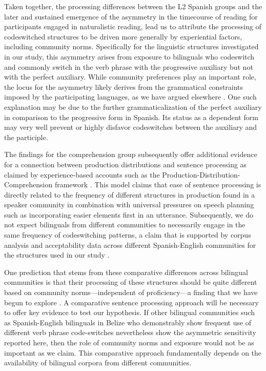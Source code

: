\documentclass[output=paper,colorlinks,citecolor=brown]{langscibook}
\begin{document}
Taken together, the processing differences between the L2 Spanish groups and the later and sustained emergence of the asymmetry in the timecourse of reading for participants engaged in naturalistic reading, lead us to attribute the processing of codeswitched structures to be driven more generally by experiential factors, including community norms. Specifically for the linguistic structures investigated in our study, this asymmetry arises from exposure to bilinguals who codeswitch and commonly switch in the verb phrase with the progressive auxiliary but not with the perfect auxiliary. While community preferences play an important role, the locus for the asymmetry likely derives from the grammatical constraints imposed by the participating languages, as we have argued elsewhere \citep{GuzzardoTamargoetal2016,ValdesKroffDussias2023}. One such explanation may be due to the further grammaticalization of the perfect auxiliary in comparison to the progressive form in Spanish. Its status as a dependent form may very well prevent or highly disfavor codeswitches between the auxiliary and the participle.

The findings for the comprehension group subsequently offer additional evidence for a connection between production distributions and sentence processing as claimed by experience-based accounts such as the Production-Distribution-Comprehension framework \citep{MacDonald2013}. This model claims that ease of sentence processing is directly related to the frequency of different structures in production found in a speaker community in combination with universal pressures on speech planning such as incorporating easier elements first in an utterance. Subsequently, we do not expect bilinguals from different communities to necessarily engage in the same frequency of codeswitching patterns, a claim that is supported by corpus analysis and acceptability data across different Spanish-English communities for the structures used in our study \citep{Balam2016,Balametal2020}.

One prediction that stems from these comparative differences across bilingual communities is that their processing of these structures should be quite different based on community norms---independent of proficiency---a finding that we have begun to explore \citep{Treadwayetal2025}. A comparative sentence processing approach will be necessary to offer key evidence to test our hypothesis. If other bilingual communities such as Spanish-English bilinguals in Belize who demonstrably show frequent use of different verb phrase code-switches nevertheless show the asymmetric sensitivity reported here, then the role of community norms and exposure would not be as important as we claim. This comparative approach fundamentally depends on the availability of bilingual corpora from different communities.
\end{document}
